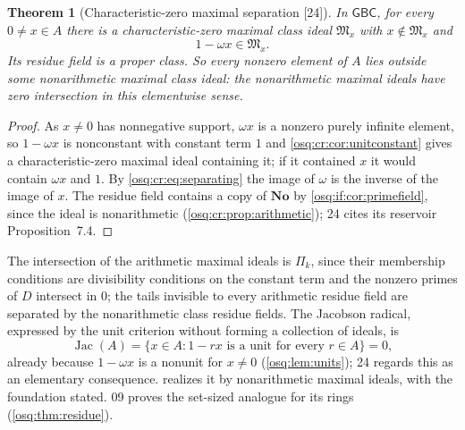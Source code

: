 \documentclass[11pt,letterpaper]{article}
\numberwithin{equation}{section}
\newtheorem{theorem}{Theorem}[section]
\theoremstyle{definition}
\theoremstyle{remark}
\theoremstyle{plain}
\newcommand{\No}{\mathbf{No}}
\newcommand{\Jac}{\operatorname{Jac}}
\newcommand{\src}[1]{\textup{\textsf{[#1]}}}
\begin{document}
\begin{theorem}[Characteristic-zero maximal separation \src{24}]\label{osq:cr:thm:separation}
In $\mathsf{GBC}$, for every $0\ne x\in A$ there is a characteristic-zero maximal class ideal $\mathfrak M_x$ with $x\notin\mathfrak M_x$ and
\begin{equation}\label{osq:cr:eq:separating}
 1-\omega x\in\mathfrak M_x .
\end{equation}
Its residue field is a proper class. So every nonzero element of $A$ lies outside some nonarithmetic maximal class ideal: the nonarithmetic maximal
ideals have zero intersection in this elementwise sense.
\end{theorem}
\begin{proof}
As $x\ne0$ has nonnegative support, $\omega x$ is a nonzero purely infinite element, so $1-\omega x$ is nonconstant with constant term $1$ and
\cref{osq:cr:cor:unitconstant} gives a characteristic-zero maximal ideal containing it; if it contained $x$ it would contain $\omega x$ and $1$.
By \eqref{osq:cr:eq:separating} the image of $\omega$ is the inverse of the image of $x$. The residue field contains a copy of $\No$ by
\cref{osq:if:cor:primefield}, since the ideal is nonarithmetic (\cref{osq:cr:prop:arithmetic}); 24 cites its reservoir Proposition~7.4.
\end{proof}

The intersection of the arithmetic maximal ideals is $\Pi_k$, since their membership conditions are divisibility conditions on the constant term and
the nonzero primes of $D$ intersect in $0$; the tails invisible to every arithmetic residue field are separated by the nonarithmetic class residue fields.
The Jacobson radical, expressed by the unit criterion without forming a collection of ideals, is
\[
 \Jac(A)=\{x\in A:1-rx\text{ is a unit for every }r\in A\}=0,
\]
already because $1-\omega x$ is a nonunit for $x\ne0$ (\cref{osq:lem:units}); 24 regards this as an elementary consequence. 
realizes it by nonarithmetic maximal ideals, with the foundation stated. 09 proves the set-sized analogue for its rings (\cref{osq:thm:residue}).
\end{document}
